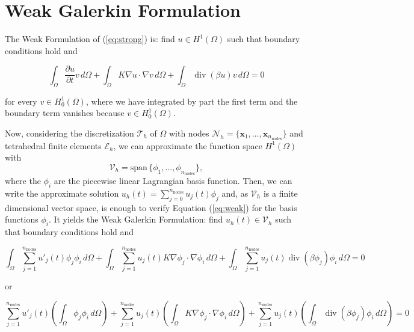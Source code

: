 \documentclass[hidelinks]{article}
\DeclareMathOperator{\divg}{div}
\begin{document}
\section{Weak Galerkin Formulation}
The Weak Formulation of (\ref{eq:strong}) is: find $u \in H^1(\Omega)$ such that boundary conditions hold and 

\begin{equation}\tag{$W$}\label{eq:weak}
\int_\Omega \frac{\partial u}{\partial t } v \,d\Omega + \int_\Omega K \nabla u \cdot \nabla v \,d\Omega + \int_\Omega \divg( \beta u) v\,d\Omega = 0
\end{equation}

for every $v \in H^1_0(\Omega)$, where we have integrated by part the first term and the boundary term vanishes because $v \in H^1_0(\Omega)$.

Now, considering the discretization $\mathcal{T}_h$ of $\Omega$ with nodes $\mathcal{N}_h = \{\mathbf{x}_1, \dots, \mathbf{x}_{n_\text{nodes}}\}$ and tetrahedral finite elements $\mathcal{E}_h$, we can approximate the function space $H^1(\Omega)$ with 
\[
\mathcal{V}_h = \text{span}\, \{\phi_1, \dots, \phi_{n_\text{nodes}} \}, 
\]
where the $\phi_i$ are the piecewise linear Lagrangian basis function. Then, we can write the approximate solution $u_h(t) = \sum_{j=0}^{n_\text{nodes}} u_j(t) \phi_j$ and, as $\mathcal{V}_h$ is a finite dimensional vector space, is enough to verify Equation (\ref{eq:weak}) for the basis functions $\phi_i$. It yields the Weak Galerkin Formulation: find $u_h(t) \in \mathcal{V}_h$ such that boundary conditions hold and

\begin{equation}\tag{$W_h$}\label{eq:weakGalerkin1}
\int_\Omega \sum_{j=1}^{n_\text{nodes}} u'_j(t)\phi_j\phi_i \,d\Omega +\int_\Omega \sum_{j=1}^{n_\text{nodes}} u_j(t) K \nabla \phi_j \cdot \nabla \phi_i \,d\Omega + \int_\Omega \sum_{j=1}^{n_\text{nodes}} u_j(t) \divg( \beta \phi_j) \phi_i\,d\Omega = 0
\end{equation}

or 

\begin{equation}\tag{$W_h$}\label{eq:weakGalerkin2}
\sum_{j=1}^{n_\text{nodes}} u'_j(t) \left( \int_\Omega \phi_j\phi_i \,d\Omega \right) + \sum_{j=1}^{n_\text{nodes}} u_j(t) \left(\int_\Omega K  \nabla \phi_j \cdot \nabla \phi_i \,d\Omega\right) + \sum_{j=1}^{n_\text{nodes}} u_j(t) \left(\int_\Omega  \divg( \beta \phi_j) \phi_i\,d\Omega\right) = 0
\end{equation}
\end{document}
